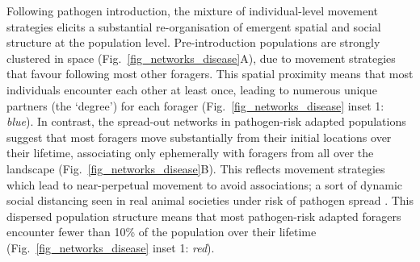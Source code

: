 Following pathogen introduction, the mixture of individual-level movement strategies elicits a substantial re-organisation of emergent spatial and social structure at the population level.
Pre-introduction populations are strongly clustered in space (Fig.~\ref{fig_networks_disease}A), due to movement strategies that favour following most other foragers.
This spatial proximity means that most individuals encounter each other at least once, leading to numerous unique partners (the `degree') for each forager (Fig.~\ref{fig_networks_disease} inset 1: \emph{blue}).
In contrast, the spread-out networks in pathogen-risk adapted populations suggest that most foragers move substantially from their initial locations over their lifetime, associating only ephemerally with foragers from all over the landscape (Fig.~\ref{fig_networks_disease}B).
This reflects movement strategies which lead to near-perpetual movement to avoid associations; a sort of dynamic social distancing seen in real animal societies under risk of pathogen spread \autocite{weinstein2018,stroeymeyt2018,pusceddu2021,stockmaier2021}.
This dispersed population structure means that most pathogen-risk adapted foragers encounter fewer than 10\% of the population over their lifetime (Fig.~\ref{fig_networks_disease} inset 1: \emph{red}).


